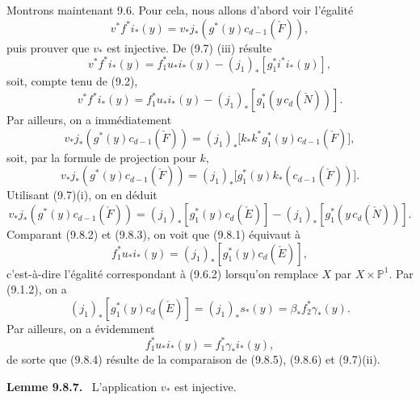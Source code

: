 \documentclass[11pt]{article}
\newenvironment{statement}[1]{\par\medskip\noindent\textbf{#1.}\ }{\par\medskip}
\begin{document}
Montrons maintenant 9.6. Pour cela, nous allons d'abord voir l'égalité
\[
v^*f^*i_*(y)=v_*j_*(g^*(y)c_{d-1}(\check F)),
\tag{9.8.1}
\]
puis prouver que $v_*$ est injective. De (9.7) (iii) résulte
\[
v^*f^*i_*(y)=f_1^*u_*i_*(y)-(j_1)_*[g_1^*i^*i_*(y)],
\]
soit, compte tenu de (9.2),
\[
v^*f^*i_*(y)=f_1^*u_*i_*(y)-(j_1)_*[g_1^*(y\,c_d(\check N))].
\tag{9.8.2}
\]
Par ailleurs, on a immédiatement
\[
v_*j_*(g^*(y)c_{d-1}(\check F))
=(j_1)_*\bigl[k_*k^*g_1^*(y)c_{d-1}(\check F)\bigr],
\]
soit, par la formule de projection pour $k$,
\[
v_*j_*(g^*(y)c_{d-1}(\check F))
=(j_1)_*\bigl[g_1^*(y)k_*(c_{d-1}(\check F))\bigr].
\]
Utilisant (9.7)(i), on en déduit
\[
v_*j_*(g^*(y)c_{d-1}(\check F))
=(j_1)_*[g_1^*(y)c_d(\check E)]-(j_1)_*[g_1^*(y\,c_d(\check N))].
\tag{9.8.3}
\]
Comparant (9.8.2) et (9.8.3), on voit que (9.8.1) équivaut à
\[
f_1^*u_*i_*(y)=(j_1)_*[g_1^*(y)c_d(\check E)],
\tag{9.8.4}
\]
c'est-à-dire l'égalité correspondant à (9.6.2) lorsqu'on remplace $X$ par $X\times\mathbb P^1$. Par (9.1.2), on a
\[
(j_1)_*[g_1^*(y)c_d(\check E)]=(j_1)_*s_*(y)=\beta_*f_2^*\gamma_*(y).
\tag{9.8.5}
\]
Par ailleurs, on a évidemment
\[
f_1^*u_*i_*(y)=f_1^*\gamma_*i_*(y),
\tag{9.8.6}
\]
de sorte que (9.8.4) résulte de la comparaison de (9.8.5), (9.8.6) et (9.7)(ii).

\begin{statement}{Lemme 9.8.7}
L'application $v_*$ est injective.
\end{statement}
\end{document}
